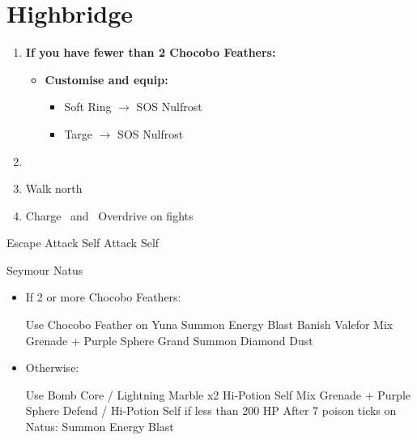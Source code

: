 \chapter{Highbridge}
\begin{enumerate}
	\item \textbf{If you have fewer than 2 Chocobo Feathers:}
		\begin{itemize}
			\item \textbf{Customise and equip:}
				\begin{itemize}
					\item Soft Ring $\rightarrow$ SOS Nulfrost
					\item Targe $\rightarrow$ SOS Nulfrost						
				\end{itemize}
		\end{itemize}
	\item \formation{\tidus}{\yuna}{\rikku}
	\item Walk north
	\item Charge \yuna\ and \rikku\ Overdrive on fights
\end{enumerate}
\begin{encounters}
	\begin{itemize}
		\tidusf Escape
		\rikkuf Attack Self
		\yunaf Attack Self
	\end{itemize}
\end{encounters}
\begin{battle}[36000]{Seymour Natus}
	\begin{itemize}
		\item If 2 or more Chocobo Feathers:
			\begin{itemize}
				\switch{\tidus}{\rikku}
				\rikkuf Use Chocobo Feather on Yuna
				\yunaf Summon \valefor
				\valeforf Energy Blast
				\enemyf Banish Valefor
				\rikkuf Mix Grenade + Purple Sphere
				\yunaf Grand Summon \shiva
				\shivaf Diamond Dust
			\end{itemize}
		\item Otherwise:
			\begin{itemize}
				\switch{\tidus}{\rikku}
				\rikkuf Use Bomb Core / Lightning Marble x2
				\yunaf Hi-Potion Self
				\rikkuf Mix Grenade + Purple Sphere
				\yunaf Defend / Hi-Potion Self if less than 200 HP
				\yunaf After 7 poison ticks on Natus: Summon \valefor
				\valeforf Energy Blast
			\end{itemize}
	\end{itemize}
\end{battle}
